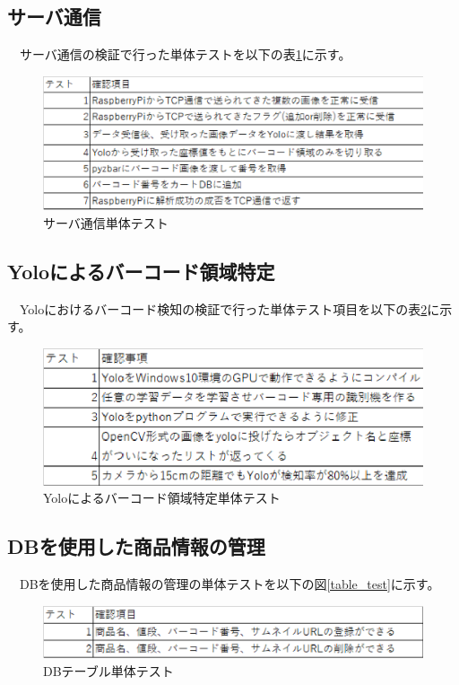 \subsection*{サーバ通信}
　サーバ通信の検証で行った単体テストを以下の表\ref{server_test}に示す。
\begin{figure}[htbp]
\centering
\includegraphics[width=12cm]{./pic/server_test.eps}
\caption{サーバ通信単体テスト}
\label{server_test}
\end{figure}

\subsection*{Yoloによるバーコード領域特定}
　Yoloにおけるバーコード検知の検証で行った単体テスト項目を以下の表\ref{yolo_test}に示す。
\begin{figure}[htbp]
\centering
\includegraphics[width=12cm]{./pic/yolo_test.eps}
\caption{Yoloによるバーコード領域特定単体テスト}
\label{yolo_test}
\end{figure}

\subsection*{DBを使用した商品情報の管理}
　DBを使用した商品情報の管理の単体テストを以下の図\ref{table_test}に示す。

\begin{figure}[htbp]
\centering
\includegraphics[width=12cm]{./pic/table_test.eps}
\caption{DBテーブル単体テスト}
\label{db_test}
\end{figure}


